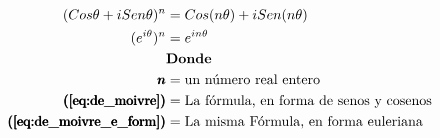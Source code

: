 
\begin{align}
    (Cos\theta + iSen\theta)^n &= Cos(n\theta) + iSen(n\theta)
        \label{eq:de_moivre} \\
    (e^{i\theta})^n &= e^{in\theta}
        \label{eq:de_moivre_e_form} \\
    & \textbf{Donde} \nonumber \\
    \pmb{n}&= \text{un número real entero} \nonumber \\
    \pmb{(\ref{eq:de_moivre})}&= \text{La fórmula, en forma de senos y cosenos} \nonumber \\
    \pmb{(\ref{eq:de_moivre_e_form})}&= \text{La misma Fórmula, en forma euleriana} \nonumber
\end{align}